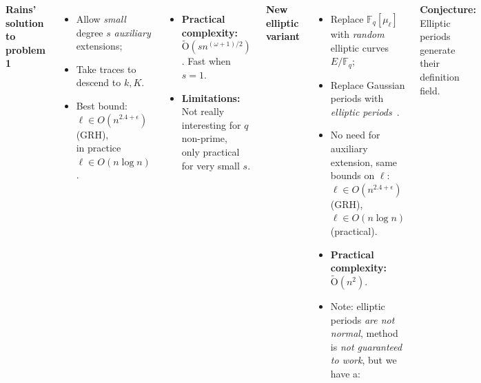 \documentclass[20pt,a0paper,blockverticalspace=7mm]{tikzposter}
\def\F {\ensuremath{\mathbb{F}}}
\def\tildO {\ensuremath{\mathrm{\tilde{O}}}}
\renewcommand{\paragraph}[1]{\smallskip\textbf{#1}}
\begin{document}
\begin{columns}
{    \paragraph{Rains' solution to problem 1}
    \begin{itemize}
    \item Allow \emph{small} degree $s$ \emph{auxiliary}\\ extensions;
    \item Take traces to descend to $k, K$.
    \item Best bound: $\ell\in O(n^{2.4+\epsilon})$ (GRH),\\
      in practice $\ell\in O(n\log n)$.
    \end{itemize}
    
    \begin{itemize}
    \item \textbf{Practical complexity:}
      $\tildO\left(sn^{(\omega+1)/2}\right)$. Fast when $s=1$.
    \item \textbf{Limitations:}  Not really interesting for $q$ non-prime,\\
      only practical for very small $s$.
    \end{itemize}
    
    \paragraph{New elliptic variant}
    \begin{itemize}
    \item Replace $\F_q[\mu_\ell]$ with \emph{random} elliptic curves
      $E/\F_q$;
    \item Replace Gaussian periods with \emph{elliptic
        periods}~\cite{mihailescu+morain+schost07}.
    \item No need for auxiliary extension, same bounds on $\ell$:\\
      $\ell\in O(n^{2.4+\epsilon})$ (GRH),
      $\ell\in O(n\log n)$ (practical).
    \item \textbf{Practical complexity:} $\tildO\left(n^2\right)$.
    \item Note: elliptic periods \emph{are not normal}, method is
      \emph{not guaranteed to work}, but we have a:
    \end{itemize}

    \paragraph{Conjecture:} Elliptic periods generate their definition
    field.
  }


\end{columns}
\end{document}
